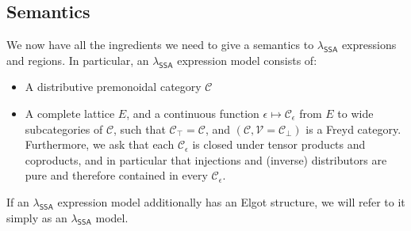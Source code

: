 \documentclass[acmsmall,screen,review]{acmart}
\newcounter{todos}
\newcommand{\todo}[1]{\stepcounter{todos} \textcolor{red}{TODO \arabic{todos}: #1}}
\newcommand{\mc}[1]{\ensuremath{\mathcal{#1}}}
\newcommand{\ms}[1]{\ensuremath{\mathsf{#1}}}
\newcommand{\isotopessa}{\(\lambda_{\ms{SSA}}\)}
\begin{document}

\subsection{Semantics}

We now have all the ingredients we need to give a semantics to \isotopessa{} expressions and regions.
In particular, an \isotopessa{} expression model consists of:
\begin{itemize}
  \item A distributive premonoidal category $\mc{C}$
  \item A complete lattice $E$, and a continuous function $\epsilon \mapsto \mc{C}_\epsilon$ from
  $E$ to wide subcategories of $\mc{C}$, such that $\mc{C}_\top = \mc{C}$, and $(\mc{C}, \mc{V} =
  \mc{C}_\bot)$ is a Freyd category. Furthermore, we ask that each $\mc{C}_\epsilon$ is closed under
  tensor products and coproducts, and in particular that injections and (inverse) distributors are
  pure and therefore contained in every $\mc{C}_\epsilon$.
\end{itemize}
If an \isotopessa{} expression model additionally has an Elgot structure, we will refer to it simply
as an \isotopessa{} model.
\end{document}
